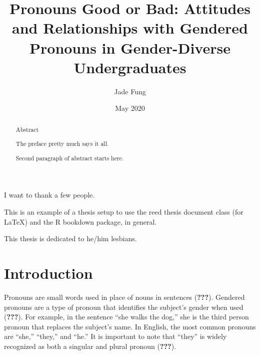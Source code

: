 \documentclass[12pt,twoside]{reedthesis}
\title{Pronouns Good or Bad: Attitudes and Relationships with Gendered Pronouns in Gender-Diverse Undergraduates}
\author{Jade Fung}
\date{May 2020}
\begin{document}
  \maketitle

\frontmatter %
\pagestyle{empty} %
  \begin{acknowledgements}
    I want to thank a few people.
  \end{acknowledgements}
  \begin{preface}
    This is an example of a thesis setup to use the reed thesis document class
    (for LaTeX) and the R bookdown package, in general.
  \end{preface}
  \hypersetup{linkcolor=black}
  \setcounter{tocdepth}{2}
  \tableofcontents

  \listoftables

  \listoffigures
  \begin{abstract}
    \hypertarget{abstract}{%
    \chapter{Abstract}\label{abstract}}
    
    The preface pretty much says it all.
    
    \par
    
    Second paragraph of abstract starts here.
  \end{abstract}
  \begin{dedication}
    This thesis is dedicated to he/him lesbians.
  \end{dedication}
\mainmatter %
\pagestyle{fancyplain} %

\hypertarget{introduction}{%
\chapter*{Introduction}\label{introduction}}

Pronouns are small words used in place of nouns in sentences ({\textbf{???}}). Gendered pronouns are a type of pronoun that identifies the subject's gender when used ({\textbf{???}}). For example, in the sentence ``she walks the dog,'' she is the third person pronoun that replaces the subject's name. In English, the most common pronouns are ``she,'' ``they,'' and ``he.'' It is important to note that ``they'' is widely recognized as both a singular and plural pronoun ({\textbf{???}}).
\end{document}
